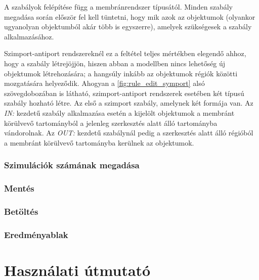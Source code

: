  A szabályok felépítése függ a membránrendszer típusától. Minden szabály megadása során először fel kell tüntetni, hogy mik azok az objektumok (olyankor ugyanolyan objektumból akár több is egyszerre), amelyek szükségesek a szabály alkalmazásához. 

Szimport-antiport rendszereknél ez a feltétel teljes mértékben elegendő ahhoz, hogy a szabály létrejöjjön, hiszen abban a modellben nincs lehetőség új objektumok létrehozására; a hangsúly inkább az objektumok régiók közötti mozgatására helyeződik. Ahogyan a \ref{fig:rule_edit_symport} alsó szövegdobozában is látható, szimport-antiport rendszerek esetében két típusú szabály hozható létre. Az első a szimport szabály, amelynek két formája van. Az \textit{IN:} kezdetű szabály alkalmazása esetén a kijelölt objektumok a membránt körülvevő tartományból a jelenleg szerkesztés alatt álló tartományba vándorolnak. Az \textit{OUT:} kezdetű szabálynál pedig a szerkesztés alatt álló régióból a membránt körülvevő tartományba kerülnek az objektumok.

\subsubsection{Szimulációk számának megadása}
\subsubsection{Mentés}
\subsubsection{Betöltés}
\subsubsection{Eredményablak}

\section{Használati útmutató}\label{help}
